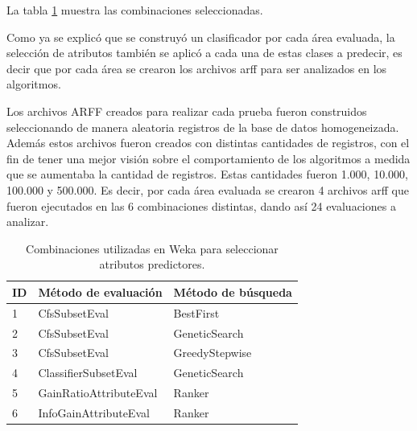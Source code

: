La tabla \ref{tab:cuadro16} muestra las combinaciones seleccionadas.

Como ya se explicó que se construyó un clasificador por cada área evaluada, la selección de atributos también se aplicó a cada una de estas clases a predecir, es decir que por cada área se crearon los archivos arff para ser analizados en los algoritmos.

Los archivos ARFF creados para realizar cada prueba fueron construidos seleccionando de manera aleatoria registros de la base de datos homogeneizada. Además estos archivos fueron creados con distintas cantidades de registros, con el fin de tener una mejor visión sobre el comportamiento de los algoritmos a medida que se aumentaba la cantidad de registros. Estas cantidades fueron 1.000, 10.000, 100.000 y 500.000. Es decir, por cada área evaluada se crearon 4 archivos arff que fueron ejecutados en las 6 combinaciones distintas, dando así 24 evaluaciones a analizar. 

\begin{table}[!Hhtb]
\centering
\begin{tabular}{|p{1cm}|p{6cm}|p{6cm}|}
\hline
	\rowcolor[gray]{0.9}
	\textbf{ID} &
	\textbf{Método de evaluación} &
	\textbf{Método de búsqueda}\\
\hline
1 & CfsSubsetEval\protect\footnotemark & BestFirst\protect\footnotemark \\ \hline
2 & CfsSubsetEval  & GeneticSearch\protect\footnotemark  \\ \hline
3 & CfsSubsetEval  & GreedyStepwise\protect\footnotemark \\ \hline
4 & ClassifierSubsetEval\protect\footnotemark & GeneticSearch \\ \hline
5 & GainRatioAttributeEval\protect\footnotemark & Ranker\protect\footnotemark \\ \hline
6 & InfoGainAttributeEval\protect\footnotemark & Ranker  \\ \hline
\end{tabular}
\caption{Combinaciones utilizadas en Weka para seleccionar atributos predictores.}
\label{tab:cuadro16}
\end{table}
\addtocounter{footnote}{-7}
\addtocounter{footnote}{1}
\addtocounter{footnote}{1}
\addtocounter{footnote}{1}
\addtocounter{footnote}{1}
\addtocounter{footnote}{1}
\addtocounter{footnote}{1}
\addtocounter{footnote}{1}
